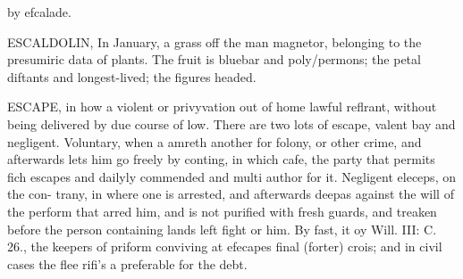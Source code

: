 by efcalade.\par\medskip
ESCALDOLIN, In January, a grass off the man
magnetor, belonging to the presumiric data of
plants. The fruit is bluebar and poly/permons; the
petal diftants and longest-lived; the figures headed.\par\medskip
ESCAPE, in how a violent or privyvation out of
home lawful reflrant, without being delivered by due
course of low. There are two lots of escape, valent
bay and negligent. Voluntary, when a amreth
another for folony, or other crime, and afterwards lets
him go freely by conting, in which cafe, the party
that permits fich escapes and dailyly commended
and multi author for it. Negligent eleceps, on the con-
trany, in where one is arrested, and afterwards deepas
against the will of the perform that arred him, and is
not purified with fresh guards, and treaken before the
person containing lands left fight or him. By fast, it
oy Will. III: C. 26., the keepers of priform conviving at
efecapes final (forter) crois; and in civil cases the flee
rifi's a preferable for the debt.\par\medskip

